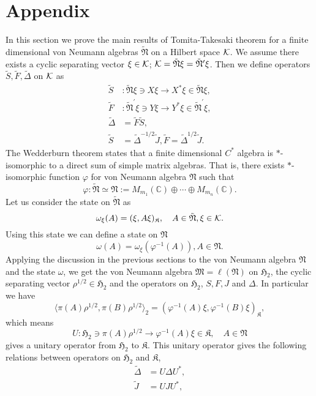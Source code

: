 \documentclass{article}
\begin{document}
\section{Appendix}
In this section we prove the main results of Tomita-Takesaki theorem for a finite dimensional
von Neumann algebras $\tilde{\mathfrak{N}}$ on a Hilbert space $\cal{K}$.
We assume there exists a cyclic separating vector $\xi\in \cal{K}$;
$\cal{K}=\tilde{\mathfrak{N}}\xi=\tilde{\mathfrak{N}}^\prime\xi$.
Then we define operators $\tilde{S},\tilde{F},\tilde{\Delta}$ on $\cal{K}$ as
\begin{equation}
\begin{split}
\tilde{S}&:\tilde{\mathfrak{N}}\xi\ni X\xi \to X^\ast \xi \in \tilde{\mathfrak{N}}\xi,\\
\tilde{F}&:\tilde{\mathfrak{N}}^\prime\xi\ni Y\xi \to Y^\ast \xi \in \tilde{\mathfrak{N}}^\prime\xi,\\
\tilde{\Delta}&=\tilde{F}\tilde{S},\\
\tilde{S}&=\tilde{\Delta}^{-1/2}\tilde{J}, \tilde{F}=\tilde{\Delta}^{1/2}\tilde{J}.
\end{split}
\end{equation}
The Wedderburn theorem states that a finite dimensional $C^{\ast}$ algebra is  $\ast$-isomorphic to a direct sum of simple matrix algebras. That is, there exists $\ast$-isomorphic function $\varphi$ for von Neumann algebra $\mathfrak{N}$ such that
$$
\varphi:\tilde{\mathfrak{N}}\simeq \mathfrak{N}:=M_{m_1}(\mathbb{C})\oplus \cdots \oplus M_{m_n}(\mathbb{C}).
$$
Let us consider the state on $\tilde{\mathfrak{N}}$ as
$$
\omega_\xi(A)=(\xi,A\xi)_{\mathfrak{K}},\quad A\in \tilde{\mathfrak{N}},\xi\in \cal{K}.
$$
Using this state we can define a state on $\mathfrak{N}$
$$
\omega(A)=\omega_\xi(\varphi^{-1}(A)),A\in \mathfrak{N}.
$$
Applying the discussion in the previous sections to the von Neumann algebra $\mathfrak{N}$ and the state
$\omega$, we get
the von Neumann algebra $\mathfrak{M}=\ell (\mathfrak{N})$ on  
$\mathfrak{H}_2$, the cyclic separating vector $\rho^{1/2}\in \mathfrak{H}_2$
and the operators on $\mathfrak{H}_2$, $S, F, J$ and $\Delta$.
In particular we have
$$
\langle \pi(A)\rho^{1/2},\pi( B)\rho^{1/2}\rangle_2=(\varphi^{-1}(A)\xi,\varphi^{-1}(B)\xi)_\mathfrak{K},
$$
which means
$$
U:\mathfrak{H}_2\ni\pi(A)\rho^{1/2}\to \varphi^{-1}(A)\xi\in\mathfrak{K}, \quad A\in \mathfrak{N}
$$
gives a unitary operator from $\mathfrak{H}_2$ to $\mathfrak{K}$.
This unitary operator gives the following relations between operators on $\mathfrak{H}_2$ and $\mathfrak{K}$,
\begin{equation}
\begin{split}
\tilde{\Delta}&=U\Delta U^{\ast},\\
\tilde{J}&=UJU^\ast ,
\end{split}
\end{equation}
\end{document}
